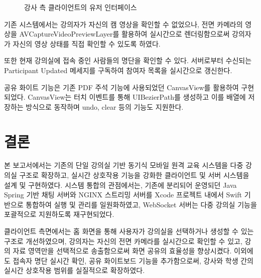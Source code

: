 \documentclass[10pt, a4paper, oneside]{article}
\begin{document}
\begin{figure}[htbp]
    \begin{center}
        \caption{강사 측 클라이언트의 유저 인터페이스}
        \label{fig:fig3}
    \end{center}
\end{figure}
기존 시스템에서는 강의자가 자신의 캠 영상을 확인할 수 없었으나, 전면 카메라의 영상을 AVCaptureVideoPreviewLayer를 활용하여 실시간으로 렌더링함으로써 강의자가 자신의 영상 상태를 직접 확인할 수 있도록 하였다.

또한 현재 강의실에 접속 중인 사람들의 명단을 확인할 수 있다. 서버로부터 수신되는 Participant Updated 메세지를 구독하여 참여자 목록을 실시간으로 갱신한다.

공유 화이트 기능은 기존 PDF 주석 기능에 사용되었던 CanvasView를 활용하여 구현되었다. CanvasView는 터치 이벤트를 통해 UIBezierPath를 생성하고 이를 배열에 저장하는 방식으로 동작하며 undo, clear 등의 기능도 지원한다.

\section{결론}
본 보고서에서는 기존의 단일 강의실 기반 동기식 모바일 원격 교육 시스템을 다중 강의실 구조로 확장하고, 실시간 상호작용 기능을 강화한 클라이언트 및 서버 시스템을 설계 및 구현하였다. 시스템 통합의 관점에서는, 기존에 분리되어 운영되던 Java Spring 기반 채팅 서버와 NGINX 스트리밍 서버를 Xcode 프로젝트 내에서 Swift 기반으로 통합하여 실행 및 관리를 일원화하였고, WebSocket 서버는 다중 강의실 기능을 포괄적으로 지원하도록 재구현되었다.

클라이언트 측면에서는 홈 화면을 통해 사용자가 강의실을 선택하거나 생성할 수 있는 구조로 개선하였으며, 강의자는 자신의 전면 카메라를 실시간으로 확인할 수 있고, 강의 자료 영역만을 선택적으로 송출함으로써 화면 공유의 효율성을 향상시켰다. 이외에도 접속자 명단 실시간 확인, 공유 화이트보드 기능을 추가함으로써, 강사와 학생 간의 실시간 상호작용 범위를 실질적으로 확장하였다.
\end{document}
